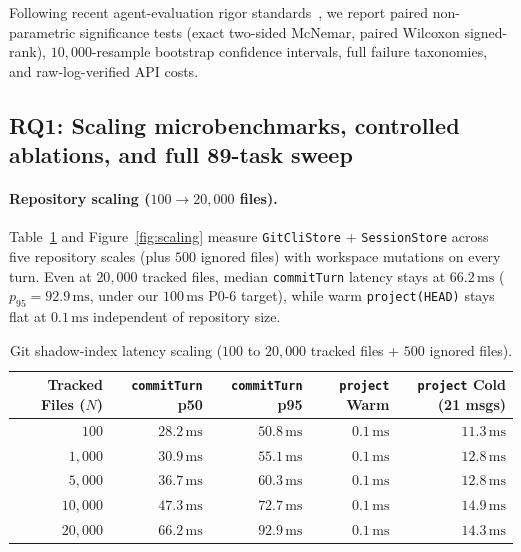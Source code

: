 \documentclass[11pt]{article}
\begin{document}
Following recent agent-evaluation rigor standards~\citep{kapoor2026hal,zhu2025abc}, we report paired non-parametric significance tests (exact two-sided McNemar, paired Wilcoxon signed-rank), $10{,}000$-resample bootstrap confidence intervals, full failure taxonomies, and raw-log-verified API costs.

\subsection{RQ1: Scaling microbenchmarks, controlled ablations, and full 89-task sweep}
\label{sec:rq1}

\paragraph{Repository scaling ($100 \to 20{,}000$ files).}
Table~\ref{tab:latency} and Figure~\ref{fig:scaling} measure \texttt{GitCliStore} + \texttt{SessionStore} across five repository scales (plus $500$ ignored files) with workspace mutations on every turn.
Even at $20{,}000$ tracked files, median \texttt{commitTurn} latency stays at $66.2\,\mathrm{ms}$ ($p_{95}=92.9\,\mathrm{ms}$, under our $100\,\mathrm{ms}$ P0-6 target), while warm \texttt{project(HEAD)} stays flat at $0.1\,\mathrm{ms}$ independent of repository size.

\begin{table}[!t]
\centering
\caption{Git shadow-index latency scaling ($100$ to $20{,}000$ tracked files + $500$ ignored files).}
\label{tab:latency}
\small
\begin{tabular}{@{}rrrrr@{}}
\toprule
\textbf{Tracked Files ($N$)} & \textbf{\texttt{commitTurn} p50} & \textbf{\texttt{commitTurn} p95} & \textbf{\texttt{project} Warm} & \textbf{\texttt{project} Cold (21 msgs)} \\
\midrule
$100$      & $28.2\,\mathrm{ms}$ & $50.8\,\mathrm{ms}$ & $0.1\,\mathrm{ms}$ & $11.3\,\mathrm{ms}$ \\
$1{,}000$  & $30.9\,\mathrm{ms}$ & $55.1\,\mathrm{ms}$ & $0.1\,\mathrm{ms}$ & $12.8\,\mathrm{ms}$ \\
$5{,}000$  & $36.7\,\mathrm{ms}$ & $60.3\,\mathrm{ms}$ & $0.1\,\mathrm{ms}$ & $12.8\,\mathrm{ms}$ \\
$10{,}000$ & $47.3\,\mathrm{ms}$ & $72.7\,\mathrm{ms}$ & $0.1\,\mathrm{ms}$ & $14.9\,\mathrm{ms}$ \\
$20{,}000$ & $66.2\,\mathrm{ms}$ & $92.9\,\mathrm{ms}$ & $0.1\,\mathrm{ms}$ & $14.3\,\mathrm{ms}$ \\
\bottomrule
\end{tabular}
\end{table}
\end{document}

